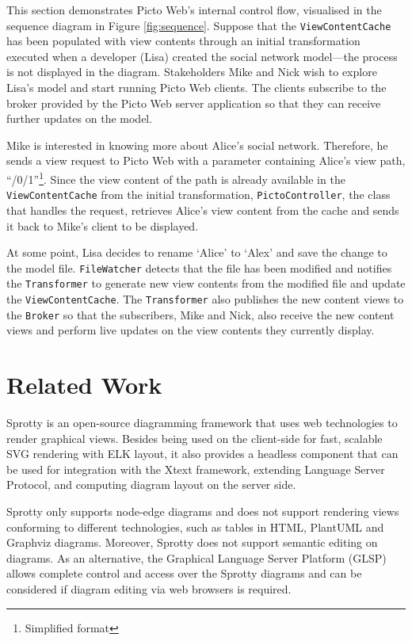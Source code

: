 \documentclass[sigconf,review]{acmart}
\begin{document}
This section demonstrates Picto Web's internal control flow, visualised in the sequence diagram in Figure \ref{fig:sequence}. Suppose that the \texttt{ViewContentCache} has been populated with view contents through an initial transformation executed when a developer (Lisa) created the social network model---the process is not displayed in the diagram. Stakeholders Mike and Nick wish to explore Lisa's model and start running Picto Web clients. The clients subscribe to the broker provided by the Picto Web server application so that they can receive further updates on the model. 

Mike is interested in knowing more about Alice's social network. Therefore, he sends a view request to Picto Web with a parameter containing Alice's view path, ``/0/1''\footnote{Simplified format}. Since the view content of the path is already available in the \texttt{ViewContentCache} from the initial transformation, \texttt{PictoController}, the class that handles the request, retrieves Alice's view content from the cache and sends it back to Mike's client to be displayed.

At some point, Lisa decides to rename `Alice' to `Alex' and save the change to the model file. \texttt{FileWatcher} detects that the file has been modified and notifies the \texttt{Transformer} to generate new view contents from the modified file and update the \texttt{ViewContentCache}. The \texttt{Transformer} also publishes the new content views to the \texttt{Broker} so that the subscribers, Mike and Nick, also receive the new content views and perform live updates on the view contents they currently display.

\section{Related Work}
Sprotty \cite{sprotty2022git} is an open-source diagramming framework that uses web technologies to render graphical views. 
Besides being used on the client-side for fast, scalable SVG rendering with ELK layout, it also provides a headless component that can be used for integration with the Xtext framework, extending Language Server Protocol, and computing diagram layout on the server side. 

Sprotty only supports node-edge diagrams and does not support rendering views conforming to different technologies, such as tables in HTML, PlantUML and Graphviz diagrams. Moreover, Sprotty does not support semantic editing on diagrams. As an alternative, the Graphical Language Server Platform (GLSP) \cite{eclipse2022glsp} allows complete control and access over the Sprotty diagrams and can be considered if diagram editing via web browsers is required.
\end{document}
